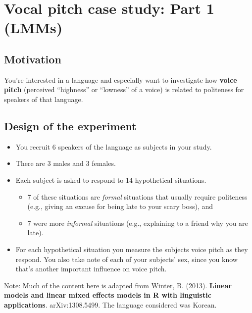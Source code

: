\documentclass[
  openany]{book}
\providecommand{\tightlist}{%
  \setlength{\itemsep}{0pt}\setlength{\parskip}{0pt}}
\begin{document}
\hypertarget{vocal-pitch-case-study-part-1-lmms}{%
\section{Vocal pitch case study: Part 1 (LMMs)}\label{vocal-pitch-case-study-part-1-lmms}}

\hypertarget{motivation}{%
\subsection{Motivation}\label{motivation}}

You're interested in a language and especially want to investigate how \textbf{voice pitch} (perceived ``highness'' or ``lowness'' of a voice) is related to politeness for speakers of that language.

\hypertarget{design-of-the-experiment}{%
\subsection{Design of the experiment}\label{design-of-the-experiment}}

\begin{itemize}
\tightlist
\item
  You recruit 6 speakers of the language as subjects in your study.
\item
  There are 3 males and 3 females.
\item
  Each subject is asked to respond to 14 hypothetical situations.

  \begin{itemize}
  \tightlist
  \item
    7 of these situations are \emph{formal} situations that usually require politeness (e.g., giving an excuse for being late to your scary boss), and
  \item
    7 were more \emph{informal} situations (e.g., explaining to a friend why you are late).
  \end{itemize}
\item
  For each hypothetical situation you measure the subjects voice pitch as they respond. You also take note of each of your subjects' sex, since you know that's another important influence on voice pitch.
\end{itemize}

Note: Much of the content here is adapted from Winter, B. (2013). \textbf{Linear models and linear mixed effects models in R with linguistic applications}. arXiv:1308.5499. The language considered was Korean.
\end{document}

